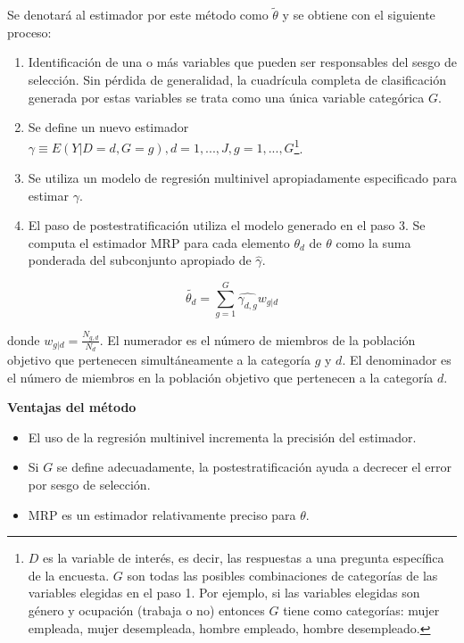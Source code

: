 \documentclass[]{article}
\let\rmarkdownfootnote\footnote%
\def\footnote{\protect\rmarkdownfootnote}
\begin{document}
Se denotará al estimador por este método como $\tilde{\theta}$ y se
obtiene con el siguiente proceso:

\begin{enumerate}
\def\labelenumi{\arabic{enumi}.}
\itemsep1pt\parskip0pt
\item
  Identificación de una o más variables que pueden ser responsables del
  sesgo de selección. Sin pérdida de generalidad, la cuadrícula completa
  de clasificación generada por estas variables se trata como una única
  variable categórica $G$.
\item
  Se define un nuevo estimador
  $\gamma \equiv E(Y|D=d, G=g), d=1,...,J, g=1,...,G$\footnote{$D$ es la
    variable de interés, es decir, las respuestas a una pregunta
    específica de la encuesta. $G$ son todas las posibles combinaciones
    de categorías de las variables elegidas en el paso 1. Por ejemplo,
    si las variables elegidas son género y ocupación (trabaja o no)
    entonces $G$ tiene como categorías: mujer empleada, mujer
    desempleada, hombre empleado, hombre desempleado.}.
\item
  Se utiliza un modelo de regresión multinivel apropiadamente
  especificado para estimar $\gamma$.
\item
  El paso de postestratificación utiliza el modelo generado en el paso
  3. Se computa el estimador MRP para cada elemento $\theta_d$ de
  $\theta$ como la suma ponderada del subconjunto apropiado de
  $\hat{\gamma}$.
\end{enumerate}

\[
\tilde{\theta_d} = \sum_{g=1}^{G} \hat{\gamma_{d,g}} w_{g|d}
\]

donde $w_{g|d}=\frac{N_{g,d}}{N_d}$. El numerador es el número de
miembros de la población objetivo que pertenecen simultáneamente a la
categoría $g$ y $d$. El denominador es el número de miembros en la
población objetivo que pertenecen a la categoría $d$.

\textbf{Ventajas del método}

\begin{itemize}
\itemsep1pt\parskip0pt
\item
  El uso de la regresión multinivel incrementa la precisión del
  estimador.
\item
  Si $G$ se define adecuadamente, la postestratificación ayuda a
  decrecer el error por sesgo de selección.
\item
  MRP es un estimador relativamente preciso para $\theta$.
\end{itemize}
\end{document}
